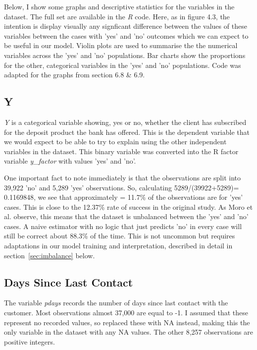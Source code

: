 \documentclass[9pt,technote]{IEEEtran}
\begin{document}
Below, I show some graphs and descriptive statistics for the variables in the dataset. The full set are available in the \textit{R} code.  Here, as in \cite{hastie21} figure 4.3, the intention is display visually any signficant difference between the values of these variables between the cases with 'yes' and 'no' outcomes which we can expect to be useful in our model.  Violin plots are used to summarise the the numerical variables across the 'yes' and 'no' populations.  Bar charts show the proportions for the other, categorical variables in the 'yes' and 'no' populations.  Code was adapted for the graphs from \cite{chang19} section 6.8 \& 6.9. 

\subsection{Y} 

\textit{Y} is a categorical variable showing, yes or no, whether the client has subscribed for the deposit product the bank has offered.  This is the dependent variable that we would expect to be able to try to explain using the other independent variables in the dataset.  This binary variable was converted into the R factor variable \textit{y\_factor} with values 'yes' and 'no'.  

One important fact to note immediately is that the observations are split into 39,922 'no' and 5,289 'yes' observations.  So, calculating 5289/(39922+5289)=  0.1169848, we see that approximately = 11.7\% of the observations are for 'yes' cases.  This is close to the 12.37\% rate of success in the original study\cite{moro14}.  As Moro et al. observe, this means that the dataset is unbalanced between the 'yes' and 'no' cases.  A naive estimator with no logic that just predicts 'no' in every case will still be correct about 88.3\% of the time.   This is not uncommon but requires adaptations in our model training and interpretation, described in detail in section~\ref{sec:imbalance} below.  

\subsection{Days Since Last Contact}

The variable \textit{pdays} records the number of days since last contact with the customer.  Most observations almost 37,000 are equal to -1.  I assumed that these represent no recorded values, so replaced these with NA instead, making this the only variable in the dataset with any NA values.  The other 8,257 observations are positive integers.  
\end{document}

